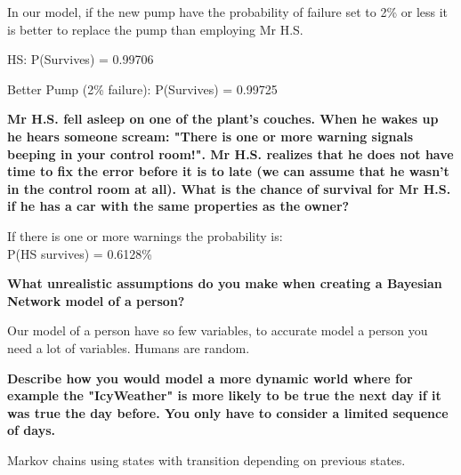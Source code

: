 \documentclass[12pt,a4paper]{article}
\begin{document}
In our model, if the new pump have the probability of failure set to 2\% or less it is better to replace the pump than employing Mr H.S.

HS:
P(Survives) = 0.99706

Better Pump (2\% failure):
P(Survives) = 0.99725


\textbf{Mr H.S. fell asleep on one of the plant's couches. When he wakes up he hears someone scream: "There is one or more warning signals beeping in your control room!". Mr H.S. realizes that he does not have time to fix the error before it is to late (we can assume that he wasn't in the control room at all). What is the chance of survival for Mr H.S. if he has a car with the same properties as the owner?}

If there is one or more warnings the probability is: \\
P(HS survives) = 0.6128\%

\textbf{What unrealistic assumptions do you make when creating a Bayesian Network model of a person?}

Our model of a person have so few variables, to accurate model a person you need a lot of variables. Humans are random.

\textbf{Describe how you would model a more dynamic world where for example the "IcyWeather" is more likely to be true the next day if it was true the day before. You only have to consider a limited sequence of days.}

Markov chains using states with transition depending on previous states.
\end{document}
